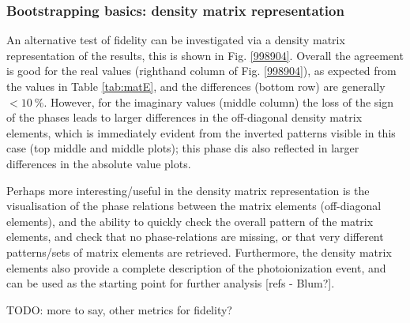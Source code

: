 \subsubsection{Bootstrapping basics: density matrix representation}

An alternative test of fidelity can be investigated via a density matrix representation of the results, this is shown in Fig. \ref{998904}. Overall the agreement is good for the real values (righthand column of Fig. \ref{998904}), as expected from the values in Table \ref{tab:matE}, and the differences (bottom row) are generally $<10~\%$. However, for the imaginary values (middle column) the loss of the sign of the phases leads to larger differences in the off-diagonal density matrix elements, which is immediately evident from the inverted patterns visible in this case (top middle and middle plots); this phase dis also reflected in larger differences in the absolute value plots.

Perhaps more interesting/useful in the density matrix representation is the visualisation of the phase relations between the matrix elements (off-diagonal elements), and the ability to quickly check the overall pattern of the matrix elements, and check that no phase-relations are missing, or that very different patterns/sets of matrix elements are retrieved. Furthermore, the density matrix elements also provide a complete description of the photoionization event, and can be used as the starting point for further analysis [refs - Blum?].

TODO: more to say, other metrics for fidelity?
